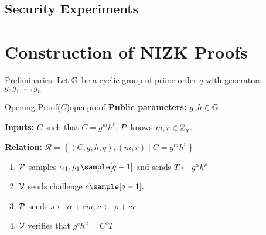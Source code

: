 \subsection{Security Experiments}





\newpage






\section{Construction of NIZK Proofs}\label{sec:sigmaproofs}





Preliminaries: Let $\mathbb{G}$ be a cyclic group of prime order $q$ with generators $g, g_1, \dots, g_n$


\newpage

\begin{construction}{Opening Proof($C$)}{openproof}
    \vspace{1em}
    \textbf{Public parameters:} $g, h \in \mathbb{G}$

    \textbf{Inputs:} $C$ such that $C = g^mh^r$, $\mathcal{P}$ knows $m, r \in \mathbb{Z}_q$.

    \textbf{Relation:} $\mathcal{R} = \left\{ (C,g,h,q),(m,r) \; | \; C = g^{m}h^r \right\}$
    \vspace{1em}

    \begin{enumerate}
        \item $\mathcal{P}$ samples $\alpha_1, \rho_1 \sample [q-1]$ and sends $T \gets g^{\alpha}h^{\rho}$
        
        \item $\mathcal{V}$ sends challenge $c \sample [q-1].$
    
        \item $\mathcal{P}$ sends $s \gets \alpha + cm, u \gets \rho + cr$
    
        \item $\mathcal{V}$ verifies that $g^{s}h^{u} = C^cT$
    \end{enumerate}
\end{construction}

